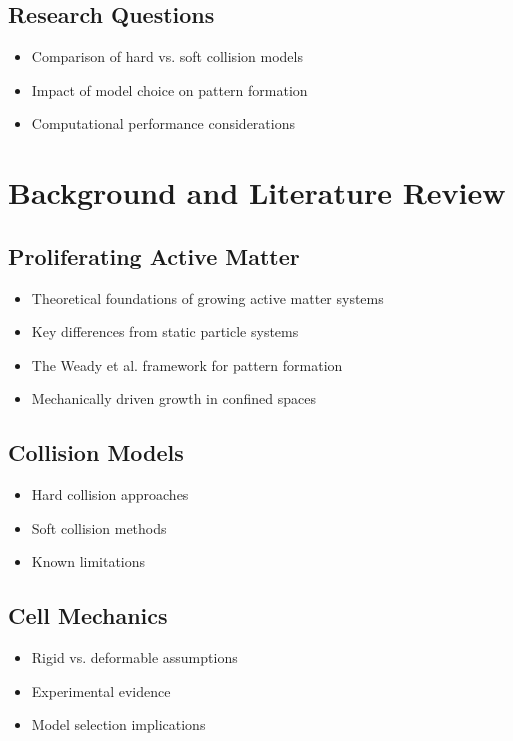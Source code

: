 \documentclass[conference]{IEEEtran}
\begin{document}
\subsection{Research Questions}
\begin{itemize}
    \item Comparison of hard vs. soft collision models
    \item Impact of model choice on pattern formation
    \item Computational performance considerations
\end{itemize}

\section{Background and Literature Review}
\subsection{Proliferating Active Matter}
\begin{itemize}
    \item Theoretical foundations of growing active matter systems
    \item Key differences from static particle systems
    \item The Weady et al. framework for pattern formation
    \item Mechanically driven growth in confined spaces
\end{itemize}

\subsection{Collision Models}
\begin{itemize}
    \item Hard collision approaches
    \item Soft collision methods
    \item Known limitations
\end{itemize}

\subsection{Cell Mechanics}
\begin{itemize}
    \item Rigid vs. deformable assumptions
    \item Experimental evidence
    \item Model selection implications
\end{itemize}
\end{document}
